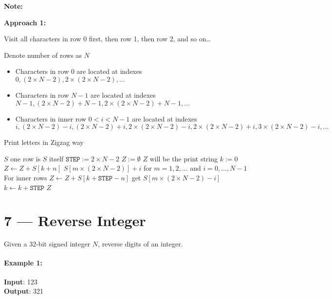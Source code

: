 \documentclass[a4paper,12pt]{article}
\begin{document}
\textbf{\large{Note:}}
\par
\vspace{0.5em}
\noindent
\textbf{Approach 1:}
\par
\noindent
Visit all characters in row 0 first, then row 1, then row 2, and so on\dots
\par
\noindent
Denote number of rows as $N$
\begin{itemize}
\item Characters in row $0$ are located at indexes $0, \left(2 \times N - 2\right), 2\times\left(2 \times N - 2\right), \ldots$
\item Characters in row $N-1$ are located at indexes $N-1, \left(2 \times N - 2\right) + N - 1, 2\times\left(2 \times N - 2\right) + N - 1, \ldots$
\item Characters in inner row $0<i<N-1$ are located at indexes 
\[
i, \left(2 \times N - 2\right)-i, \left(2 \times N - 2\right) + i, 2\times\left(2 \times N - 2\right)- i, 2\times\left(2 \times N - 2\right)+ i, 3\times\left(2 \times N - 2\right)- i, \dots
\]
\end{itemize}
\setcounter{algorithm}{0}
\begin{algorithm}[H]
\caption{Print letters in Zigzag way}
\begin{algorithmic}[1]
\Statex
{}
\State \Return $S$ \Comment one row is $S$ itself
\EndIf
\State $\mathtt{STEP} := 2 \times N -2$
\State $Z:= \emptyset$ \Comment $Z$ will be the print string
\State $k:= 0$
\State $Z \gets Z + S[k+n]$ \Comment $S[m\times \left(2 \times N - 2\right)] + i$ for $m = 1,2, \ldots$ and $i = 0, \ldots, N-1$
 \Comment For inner rows
\State $Z \gets Z + S[k+\mathtt{STEP}-n]$ \Comment get $S[m\times\left(2 \times N - 2\right)- i]$
\EndIf
\State $k \gets k+\mathtt{STEP}$
\EndWhile
\EndFor
\State \Return $Z$
\EndProcedure
\Statex
\end{algorithmic}
\end{algorithm}

\section{7 --- Reverse Integer}
Given a 32-bit signed integer $N$, reverse digits of an integer.
\paragraph{Example 1:}
\begin{flushleft}
\textbf{Input}: 123
\\
\textbf{Output}: 321
\end{flushleft}
\end{document}
